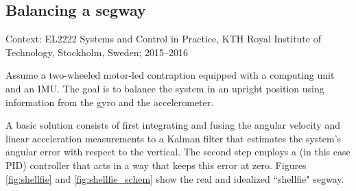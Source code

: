 \subsection{Balancing a segway}

Context: EL2222 Systems and Control in Practice, KTH Royal Institute of
Technology, Stockholm, Sweden; 2015--2016 \\

\begin{problem}
Assume a two-wheeled motor-led contraption equipped with a
computing unit and an IMU. The goal is to balance the system in an upright
position using information from the gyro and the accelerometer.
\end{problem}


A basic solution consists of first integrating and fusing the angular velocity
and linear acceleration measurements to a Kalman filter that estimates the
system's angular error with respect to the vertical. The second step employs a
(in this case PID) controller that acts in a way that keeps this error at zero.
Figures \ref{fig:shellfie} and \ref{fig:shellfie_schem} show the real and
idealized ``shellfie" segway.

